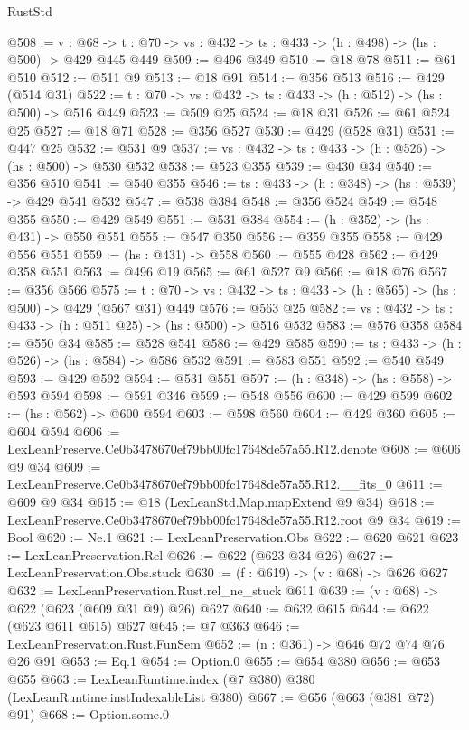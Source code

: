 \begin{lexlean}{RustStd}
\begin{coremodule}
@508 := {v : @68} ->
  {t : @70} -> {vs : @432} -> {ts : @433} -> (h : @498) -> (hs : @500) -> @429 @445 @449
@509 := @496 @349
@510 := @18 @78
@511 := @61 @510
@512 := @511 @9
@513 := @18 @91
@514 := @356 @513
@516 := @429 (@514 @31)
@522 := {t : @70} -> {vs : @432} -> {ts : @433} -> (h : @512) -> (hs : @500) -> @516 @449
@523 := @509 @25
@524 := @18 @31
@526 := @61 @524 @25
@527 := @18 @71
@528 := @356 @527
@530 := @429 (@528 @31)
@531 := @447 @25
@532 := @531 @9
@537 := {vs : @432} -> {ts : @433} -> (h : @526) -> (hs : @500) -> @530 @532
@538 := @523 @355
@539 := @430 @34
@540 := @356 @510
@541 := @540 @355
@546 := {ts : @433} -> (h : @348) -> (hs : @539) -> @429 @541 @532
@547 := @538 @384
@548 := @356 @524
@549 := @548 @355
@550 := @429 @549
@551 := @531 @384
@554 := (h : @352) -> (hs : @431) -> @550 @551
@555 := @547 @350
@556 := @359 @355
@558 := @429 @556 @551
@559 := (hs : @431) -> @558
@560 := @555 @428
@562 := @429 @358 @551
@563 := @496 @19
@565 := @61 @527 @9
@566 := @18 @76
@567 := @356 @566
@575 := {t : @70} -> {vs : @432} -> {ts : @433} -> (h : @565) -> (hs : @500) -> @429 (@567 @31) @449
@576 := @563 @25
@582 := {vs : @432} -> {ts : @433} -> (h : @511 @25) -> (hs : @500) -> @516 @532
@583 := @576 @358
@584 := @550 @34
@585 := @528 @541
@586 := @429 @585
@590 := {ts : @433} -> (h : @526) -> (hs : @584) -> @586 @532
@591 := @583 @551
@592 := @540 @549
@593 := @429 @592
@594 := @531 @551
@597 := (h : @348) -> (hs : @558) -> @593 @594
@598 := @591 @346
@599 := @548 @556
@600 := @429 @599
@602 := (hs : @562) -> @600 @594
@603 := @598 @560
@604 := @429 @360
@605 := @604 @594
@606 := LexLeanPreserve.Ce0b3478670ef79bb00fc17648de57a55.R12.denote
@608 := @606 @9 @34
@609 := LexLeanPreserve.Ce0b3478670ef79bb00fc17648de57a55.R12.__fits_0
@611 := @609 @9 @34
@615 := @18 (LexLeanStd.Map.mapExtend @9 @34)
@618 := LexLeanPreserve.Ce0b3478670ef79bb00fc17648de57a55.R12.root @9 @34
@619 := Bool
@620 := Ne.{1}
@621 := LexLeanPreservation.Obs
@622 := @620 @621
@623 := LexLeanPreservation.Rel
@626 := @622 (@623 @34 @26)
@627 := LexLeanPreservation.Obs.stuck
@630 := (f : @619) -> (v : @68) -> @626 @627
@632 := LexLeanPreservation.Rust.rel_ne_stuck @611
@639 := (v : @68) -> @622 (@623 (@609 @31 @9) @26) @627
@640 := @632 @615
@644 := @622 (@623 @611 @615) @627
@645 := @7 @363
@646 := LexLeanPreservation.Rust.FunSem
@652 := (n : @361) -> @646 @72 @74 @76 @26 @91
@653 := Eq.{1}
@654 := Option.{0}
@655 := @654 @380
@656 := @653 @655
@663 := LexLeanRuntime.index (@7 @380) @380 (LexLeanRuntime.instIndexableList @380)
@667 := @656 (@663 (@381 @72) @91)
@668 := Option.some.{0}

\end{coremodule}
\end{lexlean}
